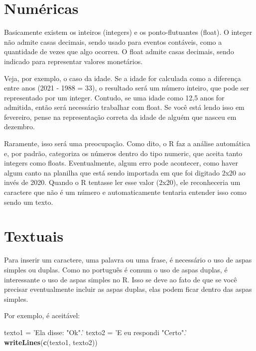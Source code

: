 \documentclass[
]{book}
\newenvironment{Shaded}{\begin{snugshade}}{\end{snugshade}}
\newcommand{\KeywordTok}[1]{\textcolor[rgb]{0.13,0.29,0.53}{\textbf{#1}}}
\newcommand{\NormalTok}[1]{#1}
\newcommand{\StringTok}[1]{\textcolor[rgb]{0.31,0.60,0.02}{#1}}
\begin{document}
\hypertarget{numuxe9ricas}{%
\section{Numéricas}\label{numuxe9ricas}}

Basicamente existem os inteiros (integers) e os ponto-flutuantes (float). O integer não admite casas decimais, sendo usado para eventos contáveis, como a quantidade de vezes que algo ocorreu. O float admite casas decimais, sendo indicado para representar valores monetários.

Veja, por exemplo, o caso da idade. Se a idade for calculada como a diferença entre anos (2021 - 1988 = 33), o resultado será um número inteiro, que pode ser representado por um integer. Contudo, se uma idade como 12,5 anos for admitida, então será necessário trabalhar com float. Se você está lendo isso em fevereiro, pense na representação correta da idade de alguém que nasceu em dezembro.

Raramente, isso será uma preocupação. Como dito, o R faz a análise automática e, por padrão, categoriza os números dentro do tipo numeric, que aceita tanto integers como floats. Eventualmente, algum erro pode acontecer, como haver algum canto na planilha que está sendo importada em que foi digitado 2x20 ao invés de 2020. Quando o R tentasse ler esse valor (2x20), ele reconheceria um caractere que não é um número e automaticamente tentaria entender isso como sendo um texto.

\hypertarget{textuais}{%
\section{Textuais}\label{textuais}}

Para inserir um caractere, uma palavra ou uma frase, é necessário o uso de aspas simples ou duplas. Como no português é comum o uso de aspas duplas, é interessante o uso de aspas simples no R. Isso se deve ao fato de que se você precisar eventualmente incluir as aspas duplas, elas podem ficar dentro das aspas simples.

Por exemplo, é aceitável:

\begin{Shaded}
\begin{Highlighting}[]
\NormalTok{texto1 =}\StringTok{ 'Ela disse: "Ok".'}
\NormalTok{texto2 =}\StringTok{ 'E eu respondi "Certo".'}
\KeywordTok{writeLines}\NormalTok{(}\KeywordTok{c}\NormalTok{(texto1, texto2))}
\end{Highlighting}
\end{Shaded}
\end{document}
